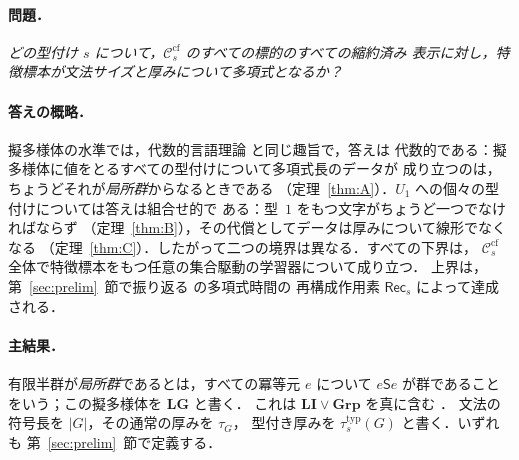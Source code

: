 \documentclass[11pt,a4paper]{ltjsarticle}
\numberwithin{equation}{section}
\theoremstyle{plain}
\theoremstyle{definition}
\theoremstyle{remark}
\theoremstyle{plain}
\newcommand{\cf}{\mathrm{cf}}
\newcommand{\Ccf}[1]{\mathcal C_{#1}^{\cf}}
\newcommand{\Rec}{\mathsf{Rec}}
\newcommand{\LG}{\mathbf{LG}}
\begin{document}
\paragraph{問題．}
\emph{どの型付け $s$ について，$\Ccf{s}$ のすべての標的のすべての縮約済み
表示に対し，特徴標本が文法サイズと厚みについて多項式となるか？}

\paragraph{答えの概略．}
擬多様体の水準では，代数的言語理論 \cite{Pin1986} と同じ趣旨で，答えは
代数的である：擬多様体に値をとるすべての型付けについて多項式長のデータが
成り立つのは，ちょうどそれが\emph{局所群}からなるときである
（定理~\ref{thm:A}）．$U_1$ への個々の型付けについては答えは組合せ的で
ある：型~$1$ をもつ文字がちょうど一つでなければならず
（定理~\ref{thm:B}），その代償としてデータは厚みについて線形でなくなる
（定理~\ref{thm:C}）．したがって二つの境界は異なる．すべての下界は，
$\Ccf{s}$ 全体で特徴標本をもつ任意の集合駆動の学習器について成り立つ．
上界は，第~\ref{sec:prelim}~節で振り返る \cite{kuriyamaCFG} の多項式時間の
再構成作用素 $\Rec_s$ によって達成される．

\paragraph{主結果．}
有限半群が\emph{局所群}であるとは，すべての冪等元 $e$ について
$e\mathsf Se$ が群であることをいう；この擬多様体を $\LG$ と書く．
これは $\mathbf{LI}\vee\mathbf{Grp}$ を真に含む
\cite{CostaNogueiraTeixeira2021}．
文法の符号長を $|G|$，その通常の厚みを $\tau_G$，
型付き厚みを $\tau^{\mathrm{typ}}_s(G)$ と書く．いずれも
第~\ref{sec:prelim}~節で定義する．
\end{document}
